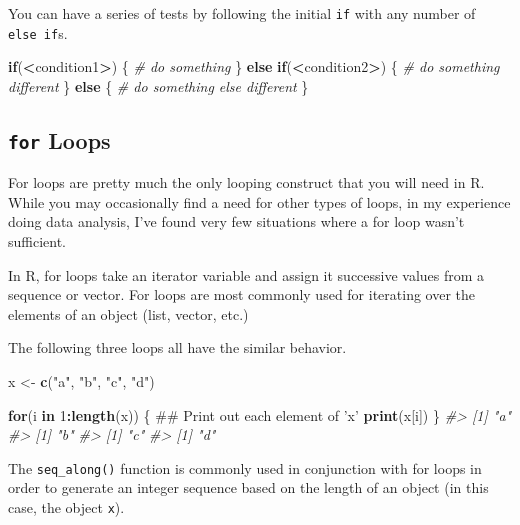 \documentclass[]{book}
\newenvironment{Shaded}{\begin{snugshade}}{\end{snugshade}}
\newcommand{\KeywordTok}[1]{\textcolor[rgb]{0.13,0.29,0.53}{\textbf{#1}}}
\newcommand{\DecValTok}[1]{\textcolor[rgb]{0.00,0.00,0.81}{#1}}
\newcommand{\StringTok}[1]{\textcolor[rgb]{0.31,0.60,0.02}{#1}}
\newcommand{\CommentTok}[1]{\textcolor[rgb]{0.56,0.35,0.01}{\textit{#1}}}
\newcommand{\ControlFlowTok}[1]{\textcolor[rgb]{0.13,0.29,0.53}{\textbf{#1}}}
\newcommand{\OperatorTok}[1]{\textcolor[rgb]{0.81,0.36,0.00}{\textbf{#1}}}
\newcommand{\NormalTok}[1]{#1}
\theoremstyle{definition}
\theoremstyle{definition}
\theoremstyle{definition}
\theoremstyle{remark}
\begin{document}
You can have a series of tests by following the initial \texttt{if} with
any number of \texttt{else\ if}s.

\begin{Shaded}
\begin{Highlighting}[]
\ControlFlowTok{if}\NormalTok{(}\OperatorTok{<}\NormalTok{condition1}\OperatorTok{>}\NormalTok{) \{}
        \CommentTok{# do something}
\NormalTok{\} }\ControlFlowTok{else} \ControlFlowTok{if}\NormalTok{(}\OperatorTok{<}\NormalTok{condition2}\OperatorTok{>}\NormalTok{)  \{}
        \CommentTok{# do something different}
\NormalTok{\} }\ControlFlowTok{else}\NormalTok{ \{}
        \CommentTok{# do something else different}
\NormalTok{\}}
\end{Highlighting}
\end{Shaded}

\subsection{\texorpdfstring{\texttt{for}
Loops}{for Loops}}\label{for-loops}

For loops are pretty much the only looping construct that you will need
in R. While you may occasionally find a need for other types of loops,
in my experience doing data analysis, I've found very few situations
where a for loop wasn't sufficient.

In R, for loops take an iterator variable and assign it successive
values from a sequence or vector. For loops are most commonly used for
iterating over the elements of an object (list, vector, etc.)

The following three loops all have the similar behavior.

\begin{Shaded}
\begin{Highlighting}[]
\NormalTok{x <-}\StringTok{ }\KeywordTok{c}\NormalTok{(}\StringTok{"a"}\NormalTok{, }\StringTok{"b"}\NormalTok{, }\StringTok{"c"}\NormalTok{, }\StringTok{"d"}\NormalTok{)}

\ControlFlowTok{for}\NormalTok{(i }\ControlFlowTok{in} \DecValTok{1}\OperatorTok{:}\KeywordTok{length}\NormalTok{(x)) \{}
\NormalTok{        ## Print out each element of 'x'}
        \KeywordTok{print}\NormalTok{(x[i])  }
\NormalTok{\}}
\CommentTok{#> [1] "a"}
\CommentTok{#> [1] "b"}
\CommentTok{#> [1] "c"}
\CommentTok{#> [1] "d"}
\end{Highlighting}
\end{Shaded}

The \texttt{seq\_along()} function is commonly used in conjunction with
for loops in order to generate an integer sequence based on the length
of an object (in this case, the object \texttt{x}).
\end{document}

